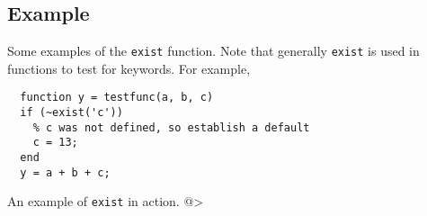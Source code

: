 \subsection{Example}

Some examples of the \verb|exist| function.  Note that generally \verb|exist|
is used in functions to test for keywords.  For example,
\begin{verbatim}
  function y = testfunc(a, b, c)
  if (~exist('c'))
    % c was not defined, so establish a default
    c = 13;
  end
  y = a + b + c;
\end{verbatim}
An example of \verb|exist| in action.
@>
